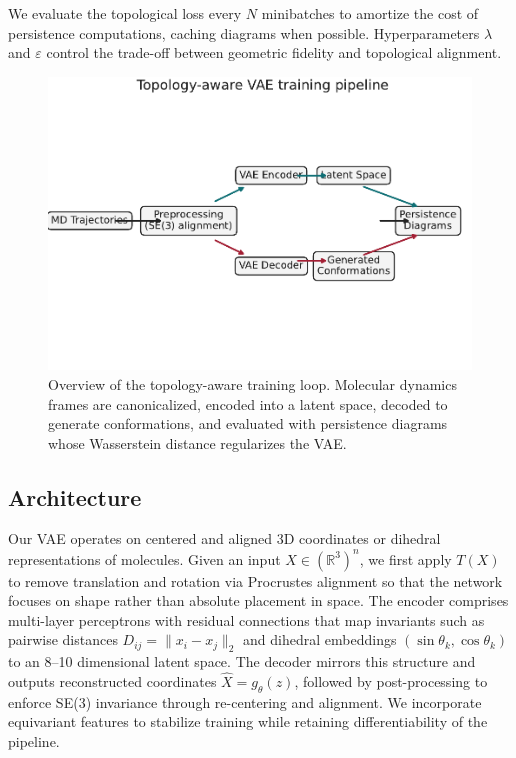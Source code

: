 \documentclass[11pt]{article}
\theoremstyle{definition}
\begin{document}
We evaluate the topological loss every $N$ minibatches to amortize the cost of persistence computations, caching diagrams when possible. Hyperparameters $\lambda$ and $\varepsilon$ control the trade-off between geometric fidelity and topological alignment.

\begin{figure}[t]
    \centering
    \includegraphics[width=0.95\linewidth]{figures/training_pipeline_overview.pdf}
    \caption{Overview of the topology-aware training loop. Molecular dynamics frames are canonicalized, encoded into a latent space, decoded to generate conformations, and evaluated with persistence diagrams whose Wasserstein distance regularizes the VAE.}
    \label{fig:training_pipeline}
\end{figure}

\subsection{Architecture}
Our VAE operates on centered and aligned 3D coordinates or dihedral representations of molecules. Given an input $X \in (\mathbb{R}^3)^n$, we first apply $T(X)$ to remove translation and rotation via Procrustes alignment so that the network focuses on shape rather than absolute placement in space. The encoder comprises multi-layer perceptrons with residual connections that map invariants such as pairwise distances $D_{ij} = \|x_i - x_j\|_2$ and dihedral embeddings $(\sin \theta_k, \cos \theta_k)$ to an 8--10 dimensional latent space. The decoder mirrors this structure and outputs reconstructed coordinates $\hat{X} = g_\theta(z)$, followed by post-processing to enforce SE(3) invariance through re-centering and alignment. We incorporate equivariant features to stabilize training while retaining differentiability of the pipeline.
\end{document}
